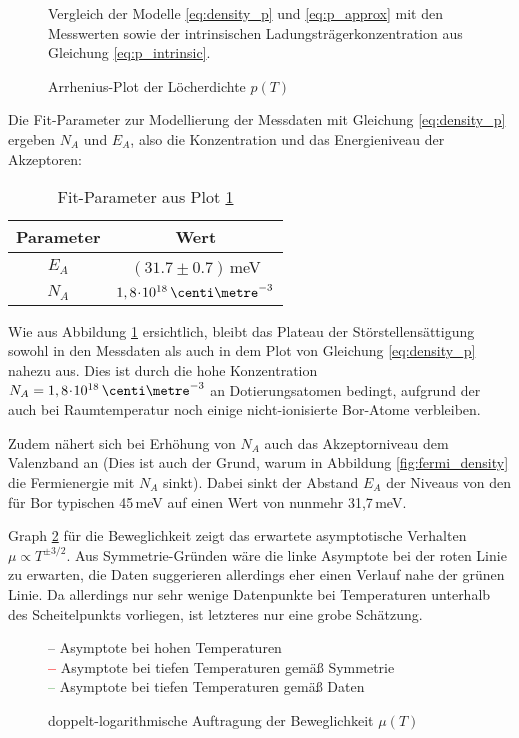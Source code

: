\begin{figure}[p]
\centering
\begin{sideways}

\end{sideways}
\caption{Arrhenius-Plot der Löcherdichte $p(T)$}
\label{fig:plot_p}
\vspace{1ex}
Vergleich der Modelle \eqref{eq:density_p} und \eqref{eq:p_approx} mit den Messwerten sowie der intrinsischen Ladungsträgerkonzentration aus Gleichung \eqref{eq:p_intrinsic}.
\end{figure}

Die Fit-Parameter zur Modellierung der Messdaten mit Gleichung \eqref{eq:density_p} ergeben $N_A$ und $E_A$, also die Konzentration und das Energieniveau der Akzeptoren:
\begin{table}[h!]
\centering
\caption{Fit-Parameter aus Plot \ref{fig:plot_p}} \label{tab:p_fit}
\begin{tabular}{cc}
	\toprule
	Parameter		& Wert 							\\
	\midrule
	$E_A$		& $(31.7 \pm 0.7)\,$meV				\\
	$N_A$		& $1,8 \cdt 10^{18}\,\centi\metre^{-3}$	\\
	\bottomrule
\end{tabular}
\end{table}

Wie aus Abbildung \ref{fig:plot_p} ersichtlich, bleibt das Plateau der Störstellensättigung sowohl in den Messdaten als auch in dem Plot von Gleichung \eqref{eq:density_p} nahezu aus. Dies ist durch die hohe Konzentration $N_A = 1,8\cdt 10^{18}\,\centi\metre^{-3}$ an Dotierungsatomen bedingt, aufgrund der auch bei Raumtemperatur noch einige nicht-ionisierte Bor-Atome verbleiben.

Zudem nähert sich bei Erhöhung von $N_A$ auch das Akzeptorniveau dem Valenzband an (Dies ist auch der Grund, warum in Abbildung \ref{fig:fermi_density} die Fermienergie mit $N_A$ sinkt). Dabei sinkt der Abstand $E_A$ der Niveaus von den für Bor typischen 45\,meV auf einen Wert von nunmehr 31,7\,meV.

Graph \ref{fig:plot_mu} für die Beweglichkeit zeigt das erwartete asymptotische Verhalten $\mu \propto T^{\pm 3/2}$. Aus Symmetrie-Gründen wäre die linke Asymptote bei der roten Linie zu erwarten, die Daten suggerieren allerdings eher einen Verlauf nahe der grünen Linie. Da allerdings nur sehr wenige Datenpunkte bei Temperaturen unterhalb des Scheitelpunkts vorliegen, ist letzteres nur eine grobe Schätzung.
\begin{figure}[p]
\centering
\begin{sideways}

\end{sideways}
\caption{doppelt-logarithmische Auftragung der Beweglichkeit $\mu(T)$}
\label{fig:plot_mu}
\textcolor{black}{--} Asymptote bei hohen Temperaturen\\
\textbf{\textcolor{red}{--}} Asymptote bei tiefen Temperaturen gemäß Symmetrie\\
\textcolor{green}{--} Asymptote bei tiefen Temperaturen gemäß Daten
\end{figure}


